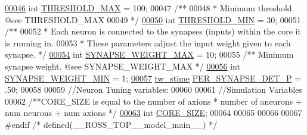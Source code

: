 \begin{DoxyCode}
\hypertarget{model__main_8h_source_l00046}{}\hyperlink{model__main_8h_a433873baf41da436ba9c1734c8c5ddd2}{00046} \textcolor{keywordtype}{int} \hyperlink{model__main_8h_a433873baf41da436ba9c1734c8c5ddd2}{THRESHOLD\_MAX} = 100;
00047 \textcolor{comment}{/**}
00048 \textcolor{comment}{ *  Minimum threshold. @see THRESHOLD\_MAX}
00049 \textcolor{comment}{ */}
\hypertarget{model__main_8h_source_l00050}{}\hyperlink{model__main_8h_a55f4484944f4174b5e677c0a71b30e4a}{00050} \textcolor{keywordtype}{int} \hyperlink{model__main_8h_a55f4484944f4174b5e677c0a71b30e4a}{THRESHOLD\_MIN} = 30;
00051 \textcolor{comment}{/**}
00052 \textcolor{comment}{ *  Each neuron is connected to the synapses (inputs) within the core it is running in.}
00053 \textcolor{comment}{ *  These parameters adjust the input weight given to each synapse. */}
\hypertarget{model__main_8h_source_l00054}{}\hyperlink{model__main_8h_a20ef6d41d2f384358522fb59fb6226cb}{00054} \textcolor{keywordtype}{int} \hyperlink{model__main_8h_a20ef6d41d2f384358522fb59fb6226cb}{SYNAPSE\_WEIGHT\_MAX} = 10;
00055 \textcolor{comment}{/** Minimum synapse weight. @see SYNAPSE\_WEIGHT\_MAX */}
\hypertarget{model__main_8h_source_l00056}{}\hyperlink{model__main_8h_af38a0e2e2483ef81f7ea5175c366ce82}{00056} \textcolor{keywordtype}{int} \hyperlink{model__main_8h_af38a0e2e2483ef81f7ea5175c366ce82}{SYNAPSE\_WEIGHT\_MIN} = 1;
\hypertarget{model__main_8h_source_l00057}{}\hyperlink{model__main_8h_a776ede5752cb807ce8cc1a9c82182bdd}{00057} \hyperlink{model__main_8h_a776ede5752cb807ce8cc1a9c82182bdd}{tw\_stime} \hyperlink{model__main_8h_a776ede5752cb807ce8cc1a9c82182bdd}{PER\_SYNAPSE\_DET\_P} = .50;
00058 
00059     \textcolor{comment}{//Neuron Tuning variables:}
00060 
00061     \textcolor{comment}{//Simulation Variables}
00062 \textcolor{comment}{/**CORE\_SIZE is equal to the number of axions * number of aneurons + num neurons + num axions */}
\hypertarget{model__main_8h_source_l00063}{}\hyperlink{model__main_8h_ad39b86a0b748731175572436f6672264}{00063} \textcolor{keywordtype}{int} \hyperlink{model__main_8h_ad39b86a0b748731175572436f6672264}{CORE\_SIZE};
00064 
00065 
00066 
00067 \textcolor{preprocessor}{#}\textcolor{preprocessor}{endif} \textcolor{comment}{/* defined(\_\_ROSS\_TOP\_\_model\_main\_\_) */}
\end{DoxyCode}
